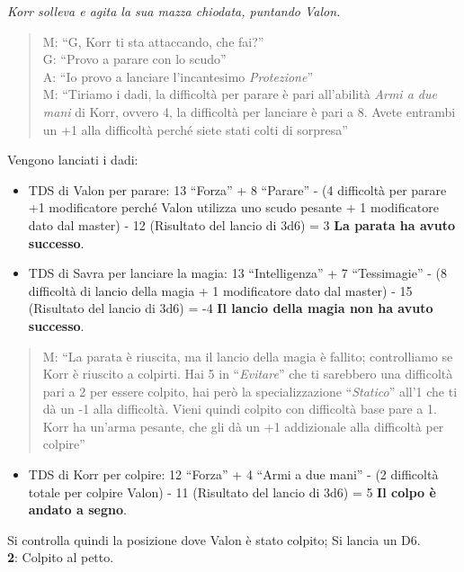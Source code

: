 \documentclass[../manuale_main.tex]{subfiles}
\begin{document}
\begin{framed}
\textit{Korr solleva e agita la sua mazza chiodata, puntando Valon.}
\begin{quote}
M: ``G, Korr ti sta attaccando, che fai?''\\
G: ``Provo a parare con lo scudo''\\
A: ``Io provo a lanciare l'incantesimo \emph{Protezione}''\\
M: ``Tiriamo i dadi, la difficoltà per parare è pari all'abilità \emph{Armi a due mani} di Korr, ovvero 4, la difficoltà per lanciare è pari a 8. Avete entrambi un +1 alla difficoltà perché siete stati colti di sorpresa''
\end{quote}
Vengono lanciati i dadi:
\begin{itemize}
\item TDS di Valon per parare: 13 ``Forza'' + 8 ``Parare'' - (4 difficoltà per parare +1 modificatore perché Valon utilizza uno scudo pesante + 1 modificatore dato dal master) - 12 (Risultato del lancio di 3d6) = 3 \textbf{La parata ha avuto successo}.
\item TDS di Savra per lanciare la magia: 13 ``Intelligenza'' + 7 ``Tessimagie'' - (8 difficoltà di lancio della magia + 1 modificatore dato dal master) - 15  (Risultato del lancio di 3d6) = -4  \textbf{Il lancio della magia non ha avuto successo}.
\end{itemize}

\begin{quote}
M: ``La parata è riuscita, ma il lancio della magia è fallito; controlliamo se Korr è riuscito a colpirti. Hai 5 in ``\emph{Evitare}'' che ti sarebbero una difficoltà pari a 2 per essere colpito, hai però la specializzazione ``\emph{Statico}'' all'1 che ti dà un -1 alla difficoltà. Vieni quindi colpito con difficoltà base pare a 1. Korr ha un'arma pesante, che gli dà un +1 addizionale alla difficoltà per colpire''\\
\end{quote}


\begin{itemize}
\item TDS di Korr per colpire: 12 ``Forza'' + 4 ``Armi a due mani'' - (2 difficoltà totale per colpire Valon) - 11 (Risultato del lancio di 3d6) = 5 \textbf{Il colpo è andato a segno}.
\end{itemize}

Si controlla quindi la posizione dove Valon è stato colpito; Si lancia un D6.\\
\textbf{2}: Colpito al petto.\\


\end{framed}
\end{document}

